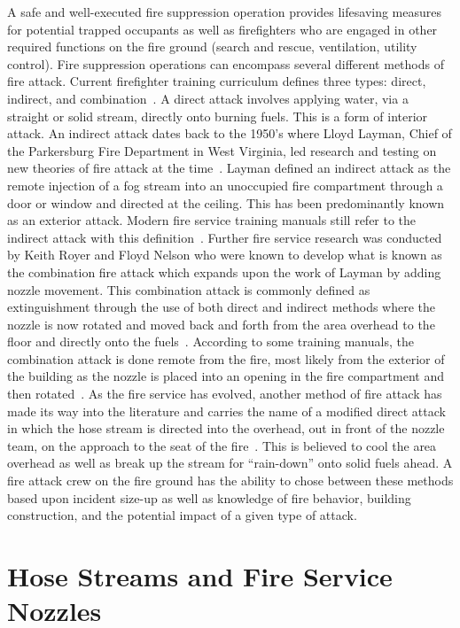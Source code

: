 \documentclass[12pt,oneside]{book}
\begin{document}
A safe and well-executed fire suppression operation provides lifesaving measures for potential trapped occupants as well as firefighters who are engaged in other required functions on the fire ground (search and rescue, ventilation, utility control). Fire suppression operations can encompass several different methods of fire attack. Current firefighter training curriculum defines three types: direct, indirect, and combination~\cite{Essentials6}. A direct attack involves applying water, via a straight or solid stream, directly onto burning fuels. This is a form of interior attack. An indirect attack dates back to the 1950's where Lloyd Layman, Chief of the Parkersburg Fire Department in West Virginia, led research and testing on new theories of fire attack at the time~\cite{ExtinguishingFires, FirefightingTactics}. Layman defined an indirect attack as the remote injection of a fog stream into an unoccupied fire compartment through a door or window and directed at the ceiling. This has been predominantly known as an exterior attack. Modern fire service training manuals still refer to the indirect attack with this definition~\cite{Essentials6,FEHandbook}. Further fire service research was conducted by Keith Royer and Floyd Nelson who were known to develop what is known as the combination fire attack which expands upon the work of Layman by adding nozzle movement. This combination attack is commonly defined as extinguishment through the use of both direct and indirect methods where the nozzle is now rotated and moved back and forth from the area overhead to the floor and directly onto the fuels~\cite{Essentials6}. According to some training manuals, the combination attack is done remote from the fire, most likely from the exterior of the building as the nozzle is placed into an opening in the fire compartment and then rotated~\cite{FEHandbook}. As the fire service has evolved, another method of fire attack has made its way into the literature and carries the name of a modified direct attack in which the hose stream is directed into the overhead, out in front of the nozzle team, on the approach to the seat of the fire~\cite{FEHandbook}. This is believed to cool the area overhead as well as break up the stream for ``rain-down'' onto solid fuels ahead. A fire attack crew on the fire ground has the ability to chose between these methods based upon incident size-up as well as knowledge of fire behavior, building construction, and the potential impact of a given type of attack.

\section*{Hose Streams and Fire Service Nozzles}
\end{document}

